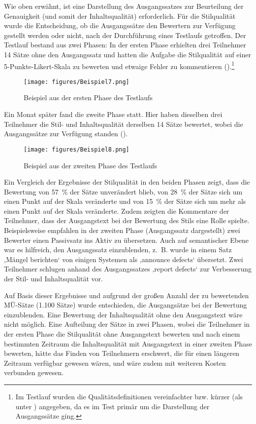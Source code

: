 Wie oben erwähnt, ist eine Darstellung des Ausgangssatzes zur Beurteilung der Genauigkeit (und somit der Inhaltsqualität) erforderlich. Für die Stilqualität wurde die Entscheidung, ob die Ausgangssätze den Bewertern zur Verfügung gestellt werden oder nicht, nach der Durchführung eines Testlaufs getroffen. Der Testlauf bestand aus zwei Phasen: In der ersten Phase erhielten drei Teilnehmer 14 Sätze ohne den Ausgangssatz und hatten die Aufgabe die Stilqualität auf einer 5-Punkte-Likert-Skala zu bewerten und etwaige Fehler zu kommentieren ().\footnote{{Im Testlauf wurden die Qualitätsdefinitionen vereinfachter bzw. kürzer (als unter ) angegeben, da es im Test primär um die Darstellung der Ausgangssätze ging.}}


\begin{figure}
\texttt{[image: figures/Beispiel7.png]}
\caption{\label{figex:4:7}Beispiel aus der ersten Phase des Testlaufs}
\end{figure}

Ein Monat später fand die zweite Phase statt. Hier haben dieselben drei Teilnehmer die Stil- und Inhaltsqualität derselben 14 Sätze bewertet, wobei die Ausgangssätze zur Verfügung standen ().

\begin{figure}
\texttt{[image: figures/Beispiel8.png]}
\caption{\label{figex:4:8}Beispiel aus der zweiten Phase des Testlaufs}
\end{figure}

Ein Vergleich der Ergebnisse der Stilqualität in den beiden Phasen zeigt, dass die Bewertung von 57~\% der Sätze unverändert blieb, von 28~\% der Sätze sich um einen Punkt auf der Skala veränderte und von 15~\% der Sätze sich um mehr als einen Punkt auf der Skala veränderte. Zudem zeigten die Kommentare der Teilnehmer, dass der Ausgangstext bei der Bewertung des Stils eine Rolle spielte. Beispielsweise empfahlen in der zweiten Phase (Ausgangssatz dargestellt) zwei Bewerter einen Passivsatz ins Aktiv zu übersetzen. Auch auf semantischer Ebene war es hilfreich, den Ausgangssatz einzublenden, z.~B. wurde in einem Satz ‚Mängel berichten‘ von einigen Systemen als ‚announce defects‘ übersetzt. Zwei Teilnehmer schlugen anhand des Ausgangssatzes ‚report defects‘ zur Verbesserung der Stil- und Inhaltsqualität vor.

Auf Basis dieser Ergebnisse und aufgrund der großen Anzahl der zu bewertenden MÜ-Sätze (1.100 Sätze) wurde entschieden, die Ausgangsätze bei der Bewertung einzublenden. Eine Bewertung der Inhaltsqualität ohne den Ausgangstext wäre nicht möglich. Eine Aufteilung der Sätze in zwei Phasen, wobei die Teilnehmer in der ersten Phase die Stilqualität ohne Ausgangstext bewerten und nach einem bestimmten Zeitraum die Inhaltsqualität mit Ausgangstext in einer zweiten Phase bewerten, hätte das Finden von Teilnehmern erschwert, die für einen längeren Zeitraum verfügbar gewesen wären, und wäre zudem mit weiteren Kosten verbunden gewesen.

